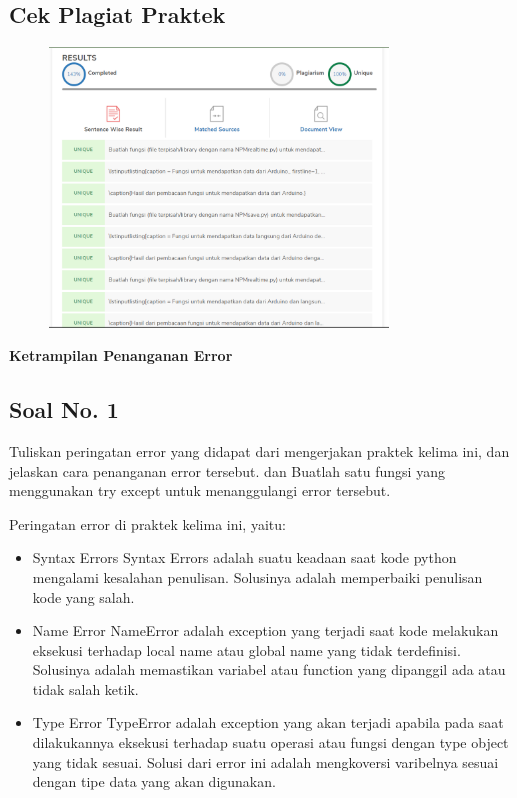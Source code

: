 \subsection{Cek Plagiat Praktek}
\begin{figure}[H]
	\includegraphics[width=9cm]{figures/5/1174031/Praktek/plagiatpraktek.png}
	\centering
\end{figure}

\hfill \break
{\Large \textbf{Ketrampilan Penanganan Error}}

\subsection{Soal No. 1}
Tuliskan  peringatan  error  yang  didapat  dari  mengerjakan  praktek  kelima  ini, dan  jelaskan  cara  penanganan  error  tersebut.   dan  Buatlah  satu  fungsi  yang menggunakan try except untuk menanggulangi error tersebut.

\hfill \break
Peringatan error di praktek kelima ini, yaitu:
\begin{itemize}
	\item Syntax Errors
	Syntax Errors adalah suatu keadaan saat kode python mengalami kesalahan penulisan. Solusinya adalah memperbaiki penulisan kode yang salah.
	
	\item Name Error
	NameError adalah exception yang terjadi saat kode melakukan eksekusi terhadap local name atau global name yang tidak terdefinisi. Solusinya adalah memastikan variabel atau function yang dipanggil ada atau tidak salah ketik.
	
	\item Type Error
	TypeError adalah exception yang akan terjadi apabila pada saat dilakukannya eksekusi terhadap suatu operasi atau fungsi dengan type object yang tidak sesuai. Solusi dari error ini adalah mengkoversi varibelnya sesuai dengan tipe data yang akan digunakan.
\end{itemize}

